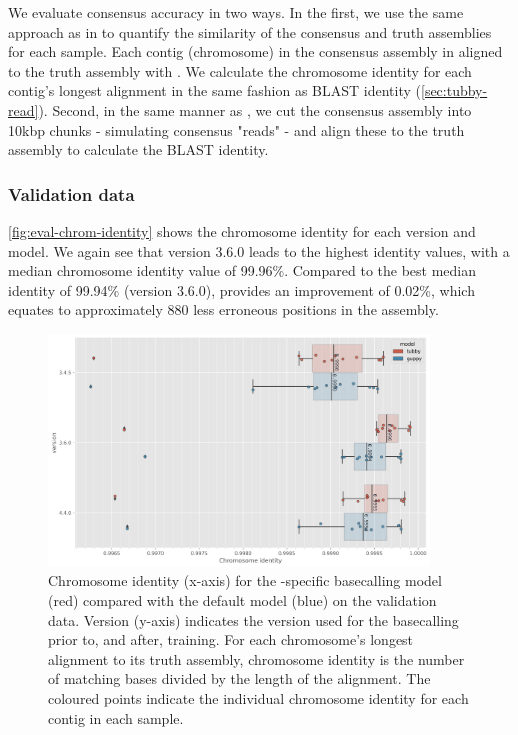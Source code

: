 We evaluate consensus accuracy in two ways. In the first, we use the same approach as in \cite{wick2020} to quantify the similarity of the consensus and truth assemblies for each sample. Each contig (chromosome) in the consensus assembly in aligned to the truth assembly with . We calculate the chromosome identity for each contig's longest alignment in the same fashion as BLAST identity (\autoref{sec:tubby-read}). Second, in the same manner as \cite{wick2019}, we cut the consensus assembly into 10kbp chunks - simulating consensus "reads" - and align these to the truth assembly to calculate the BLAST identity. 

\subsubsection{Validation data}

\autoref{fig:eval-chrom-identity} shows the chromosome identity for each version and model. We again see that \tubby{} version 3.6.0 leads to the highest identity values, with a median chromosome identity value of 99.96\%. Compared to the best median \guppy{} identity of 99.94\% (version 3.6.0), \tubby{} provides an improvement of 0.02\%, which equates to approximately 880 less erroneous positions in the \mtb{} assembly.

\begin{figure}
\includegraphics[width=0.9\textwidth]{Chapter4/Figs/eval_chromosome_identity.png}
\centering
\caption{Chromosome identity (x-axis) for the \mtb{}-specific basecalling model \tubby{} (red) compared with the default \guppy{} model (blue) on the validation data. Version (y-axis) indicates the \guppy{} version used for the basecalling prior to, and after, training. For each chromosome's longest alignment to its truth assembly, chromosome identity is the number of matching bases divided by the length of the alignment. The coloured points indicate the individual chromosome identity for each contig in each sample.}
\label{fig:eval-chrom-identity}
\end{figure}

